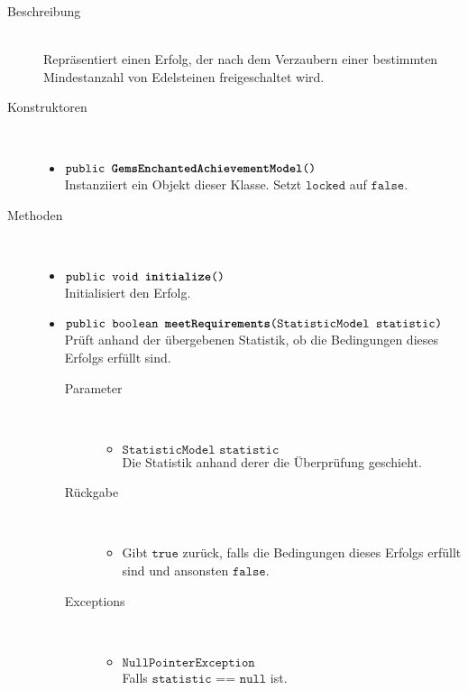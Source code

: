		\begin{description}
		\item[Beschreibung] \hfill \\ Repräsentiert einen Erfolg, der nach dem Verzaubern einer bestimmten Mindestanzahl von Edelsteinen freigeschaltet wird.
			
		\item[Konstruktoren] \hfill \\
			\vspace{-.8cm}
			\begin{itemize}
				\item $\texttt{public \textbf{GemsEnchantedAchievementModel}()}$ \\ Instanziiert ein Objekt dieser Klasse. Setzt $\texttt{locked}$ auf $\texttt{false}$.
			\end{itemize}
			
		\item[Methoden] \hfill \\
			\vspace{-.8cm}
			\begin{itemize}
				\item $\texttt{public void \textbf{initialize}()}$ \\ Initialisiert den Erfolg.
				
				\item $\texttt{public boolean \textbf{meetRequirements}(StatisticModel statistic)}$ \\ Prüft anhand der übergebenen Statistik, ob die Bedingungen dieses Erfolgs erfüllt sind.
				\begin{description}
				\item[Parameter] \hfill \\
					\vspace{-.8cm}
					\begin{itemize}
						\item $\texttt{StatisticModel statistic}$ \\ Die Statistik anhand derer die Überprüfung geschieht. 
					\end{itemize}
					\item[Rückgabe] \hfill \\
					\vspace{-.8cm}
					\begin{itemize}
						\item Gibt $\texttt{true}$ zurück, falls die Bedingungen dieses Erfolgs erfüllt sind und ansonsten $\texttt{false}$.
					\end{itemize}
					\item[Exceptions] \hfill \\
					\vspace{-.8cm}
					\begin{itemize}
						\item $\texttt{NullPointerException}$ \\ Falls $\texttt{statistic == null}$ ist.
					\end{itemize}
				\end{description}
				
			\end{itemize}
		\end{description}
		

